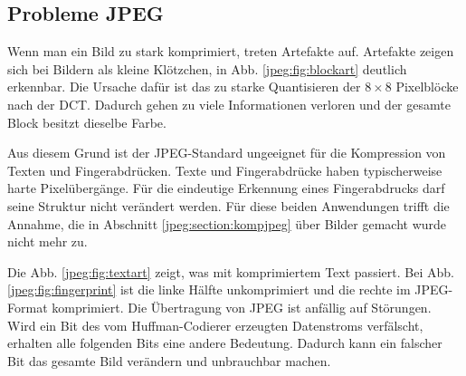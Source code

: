 \subsection{Probleme JPEG
\label{jpeg:subsection:probleme}}
Wenn man ein Bild zu stark komprimiert, treten Artefakte auf.
Artefakte zeigen sich bei Bildern als kleine Klötzchen, in Abb. \ref{jpeg:fig:blockart} deutlich erkennbar.
Die Ursache dafür ist das zu starke Quanti\-sieren der \(8\times8\) Pixelblöcke nach der DCT.
Dadurch gehen zu viele Informationen verloren und der gesamte Block besitzt dieselbe Farbe.

Aus diesem Grund ist der JPEG-Standard ungeeignet für die Kompression von Texten und Finger\-abdrücken.
Texte und Fingerabdrücke haben typischerweise harte Pixelübergänge.
Für die eindeutige Erkennung eines Fingerabdrucks darf seine Struktur nicht verändert werden.
Für diese beiden Anwendungen trifft die Annahme, die in Abschnitt \ref{jpeg:section:kompjpeg} über Bilder gemacht wurde nicht mehr zu.

Die Abb. \ref{jpeg:fig:textart} zeigt, was mit komprimiertem Text passiert.
Bei Abb. \ref{jpeg:fig:fingerprint} ist die linke Hälfte unkomprimiert und die rechte im JPEG-Format komprimiert.
Die Übertragung von JPEG ist anfällig auf Störungen.
Wird ein Bit des vom Huffman-Codierer erzeugten Datenstroms verfälscht, erhalten alle folgenden Bits eine andere Bedeutung. 
Dadurch kann ein falscher Bit das gesamte Bild verändern und unbrauchbar machen.



